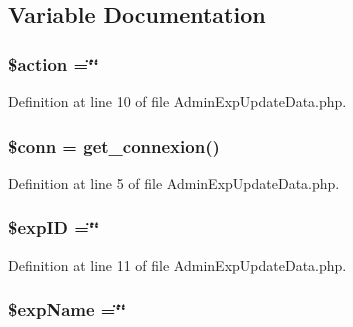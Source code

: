 \subsection{Variable Documentation}
\hypertarget{_admin_exp_update_data_8php_aa698a3e72116e8e778be0e95d908ee30}{
\subsubsection[{\$action}]{\setlength{\rightskip}{0pt plus 5cm}\$action =\char`\"{}\char`\"{}}}\label{_admin_exp_update_data_8php_aa698a3e72116e8e778be0e95d908ee30}


Definition at line 10 of file Admin\-Exp\-Update\-Data.\-php.

\hypertarget{_admin_exp_update_data_8php_aa8a5a87b9c1a6a0819b88447cbe41877}{
\subsubsection[{\$conn}]{\setlength{\rightskip}{0pt plus 5cm}\$conn = {\bf get\-\_\-connexion}()}}\label{_admin_exp_update_data_8php_aa8a5a87b9c1a6a0819b88447cbe41877}


Definition at line 5 of file Admin\-Exp\-Update\-Data.\-php.

\hypertarget{_admin_exp_update_data_8php_ae384d32e62e85e587cd27bf249ed3db3}{
\subsubsection[{\$exp\-I\-D}]{\setlength{\rightskip}{0pt plus 5cm}\${\bf exp\-I\-D} =\char`\"{}\char`\"{}}}\label{_admin_exp_update_data_8php_ae384d32e62e85e587cd27bf249ed3db3}


Definition at line 11 of file Admin\-Exp\-Update\-Data.\-php.

\hypertarget{_admin_exp_update_data_8php_a6478e66386fefd0e5fd6de22d695ffca}{
\subsubsection[{\$exp\-Name}]{\setlength{\rightskip}{0pt plus 5cm}\$exp\-Name =\char`\"{}\char`\"{}}}\label{_admin_exp_update_data_8php_a6478e66386fefd0e5fd6de22d695ffca}


